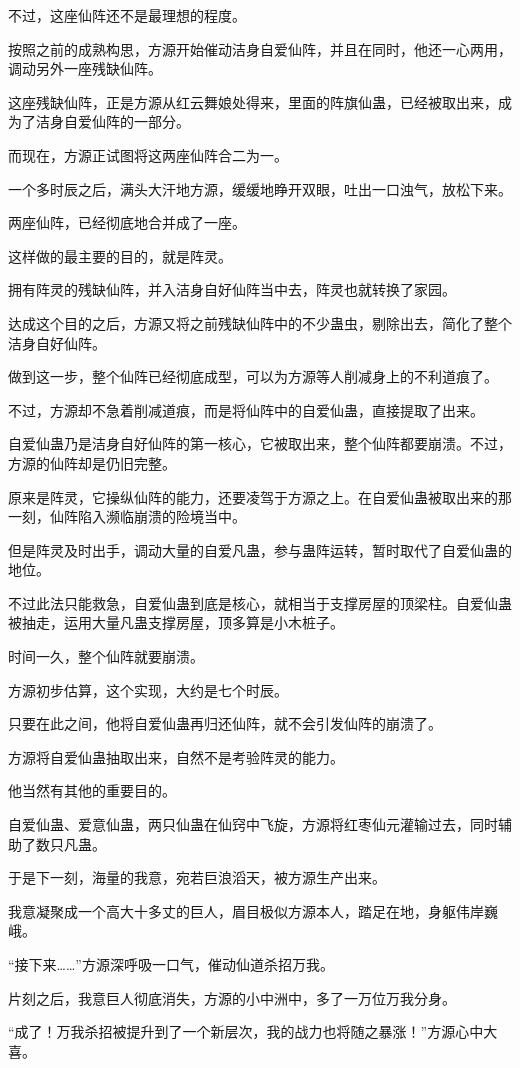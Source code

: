 \begin{this_body}
不过，这座仙阵还不是最理想的程度。

按照之前的成熟构思，方源开始催动洁身自爱仙阵，并且在同时，他还一心两用，调动另外一座残缺仙阵。

这座残缺仙阵，正是方源从红云舞娘处得来，里面的阵旗仙蛊，已经被取出来，成为了洁身自爱仙阵的一部分。

而现在，方源正试图将这两座仙阵合二为一。

一个多时辰之后，满头大汗地方源，缓缓地睁开双眼，吐出一口浊气，放松下来。

两座仙阵，已经彻底地合并成了一座。

这样做的最主要的目的，就是阵灵。

拥有阵灵的残缺仙阵，并入洁身自好仙阵当中去，阵灵也就转换了家园。

达成这个目的之后，方源又将之前残缺仙阵中的不少蛊虫，剔除出去，简化了整个洁身自好仙阵。

做到这一步，整个仙阵已经彻底成型，可以为方源等人削减身上的不利道痕了。

不过，方源却不急着削减道痕，而是将仙阵中的自爱仙蛊，直接提取了出来。

自爱仙蛊乃是洁身自好仙阵的第一核心，它被取出来，整个仙阵都要崩溃。不过，方源的仙阵却是仍旧完整。

原来是阵灵，它操纵仙阵的能力，还要凌驾于方源之上。在自爱仙蛊被取出来的那一刻，仙阵陷入濒临崩溃的险境当中。

但是阵灵及时出手，调动大量的自爱凡蛊，参与蛊阵运转，暂时取代了自爱仙蛊的地位。

不过此法只能救急，自爱仙蛊到底是核心，就相当于支撑房屋的顶梁柱。自爱仙蛊被抽走，运用大量凡蛊支撑房屋，顶多算是小木桩子。

时间一久，整个仙阵就要崩溃。

方源初步估算，这个实现，大约是七个时辰。

只要在此之间，他将自爱仙蛊再归还仙阵，就不会引发仙阵的崩溃了。

方源将自爱仙蛊抽取出来，自然不是考验阵灵的能力。

他当然有其他的重要目的。

自爱仙蛊、爱意仙蛊，两只仙蛊在仙窍中飞旋，方源将红枣仙元灌输过去，同时辅助了数只凡蛊。

于是下一刻，海量的我意，宛若巨浪滔天，被方源生产出来。

我意凝聚成一个高大十多丈的巨人，眉目极似方源本人，踏足在地，身躯伟岸巍峨。

“接下来……”方源深呼吸一口气，催动仙道杀招万我。

片刻之后，我意巨人彻底消失，方源的小中洲中，多了一万位万我分身。

“成了！万我杀招被提升到了一个新层次，我的战力也将随之暴涨！”方源心中大喜。

\end{this_body}

